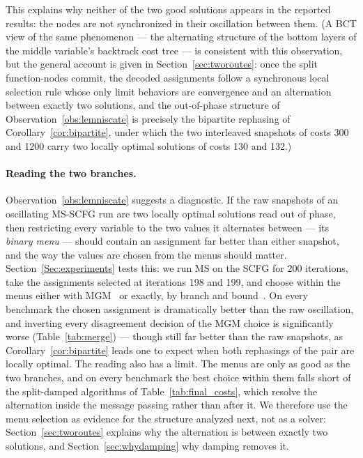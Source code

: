 \noindent This explains why neither of the two good solutions appears in the reported results: the nodes are not synchronized in their oscillation between them. (A BCT view of the same phenomenon --- the alternating structure of the bottom layers of the middle variable's backtrack cost tree --- is consistent with this observation, but the general account is given in Section~\ref{sec:tworoutes}: once the split function-nodes commit, the decoded assignments follow a synchronous local selection rule whose only limit behaviors are convergence and an alternation between exactly two solutions, and the out-of-phase structure of Observation~\ref{obs:lemniscate} is precisely the bipartite rephasing of Corollary~\ref{cor:bipartite}, under which the two interleaved snapshots of costs 300 and 1200 carry two locally optimal solutions of costs 130 and 132.)
\paragraph{Reading the two branches.}
Observation~\ref{obs:lemniscate} suggests a diagnostic.  If the raw
snapshots of an oscillating MS-SCFG run are two locally optimal solutions
read out of phase, then restricting every variable to the two values it
alternates between --- its \emph{binary menu} --- should contain an
assignment far better than either snapshot, and the way the values are
chosen from the menus should matter.  Section~\ref{Sec:experiments} tests
this: we run MS on the SCFG for 200 iterations, take the assignments
selected at iterations 198 and 199, and choose within the menus either
with MGM~\cite{MaheswaranTBPV04} or exactly, by branch and
bound~\cite{HirayamaY97}.  On every benchmark the chosen assignment is
dramatically better than the raw oscillation, and inverting every
disagreement decision of the MGM choice is significantly worse
(Table~\ref{tab:merge}) --- though still far better than the raw
snapshots, as Corollary~\ref{cor:bipartite} leads one to expect when both
rephasings of the pair are locally optimal.  The reading also has a
limit.  The menus are only as good as the two branches, and on every
benchmark the best choice within them falls short of the split-damped
algorithms of Table~\ref{tab:final_costs}, which resolve the alternation
inside the message passing rather than after it.  We therefore use the
menu selection as evidence for the structure analyzed next, not as a
solver: Section~\ref{sec:tworoutes} explains why the alternation is
between exactly two solutions, and Section~\ref{sec:whydamping} why
damping removes it.
